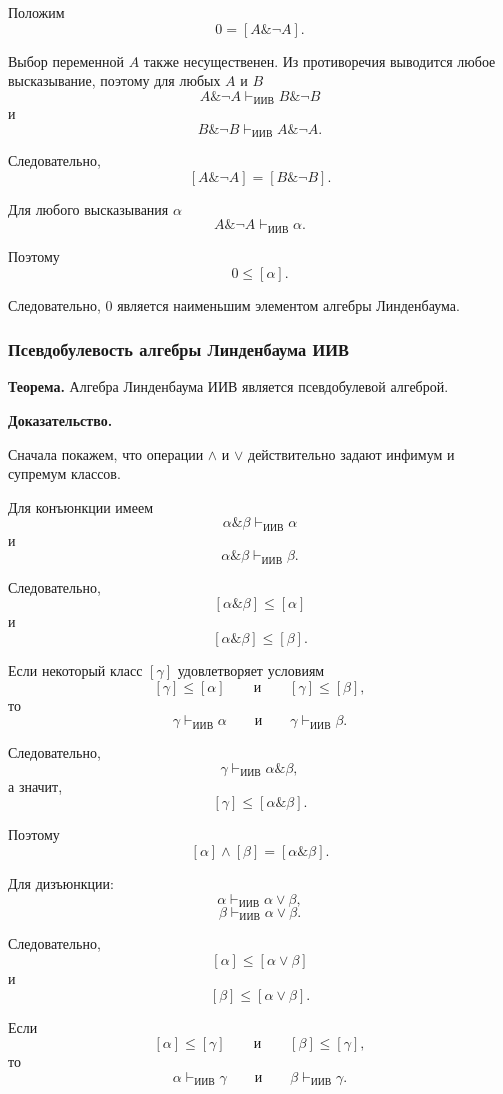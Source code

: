 \documentclass[12pt,a4paper,oneside,openany]{book}
\theoremstyle{definition}
\theoremstyle{plain}
\theoremstyle{remark}
\begin{document}
Положим
\[
0=[A\mathbin{\&}\neg A].
\]

Выбор переменной \(A\) также несущественен. Из противоречия выводится
любое высказывание, поэтому для любых \(A\) и \(B\)
\[
A\mathbin{\&}\neg A
\vdash_{\mathrm{ИИВ}}
B\mathbin{\&}\neg B
\]
и
\[
B\mathbin{\&}\neg B
\vdash_{\mathrm{ИИВ}}
A\mathbin{\&}\neg A.
\]

Следовательно,
\[
[A\mathbin{\&}\neg A]
=
[B\mathbin{\&}\neg B].
\]

Для любого высказывания \(\alpha\)
\[
A\mathbin{\&}\neg A
\vdash_{\mathrm{ИИВ}}
\alpha.
\]

Поэтому
\[
0\leq[\alpha].
\]

Следовательно, \(0\) является наименьшим элементом алгебры
Линденбаума.

\subsubsection{Псевдобулевость алгебры Линденбаума ИИВ}

\textbf{Теорема.}
Алгебра Линденбаума ИИВ является псевдобулевой алгеброй.

\textbf{Доказательство.}

Сначала покажем, что операции \(\wedge\) и \(\vee\) действительно
задают инфимум и супремум классов.

Для конъюнкции имеем
\[
\alpha\mathbin{\&}\beta
\vdash_{\mathrm{ИИВ}}
\alpha
\]
и
\[
\alpha\mathbin{\&}\beta
\vdash_{\mathrm{ИИВ}}
\beta.
\]

Следовательно,
\[
[\alpha\mathbin{\&}\beta]\leq[\alpha]
\]
и
\[
[\alpha\mathbin{\&}\beta]\leq[\beta].
\]

Если некоторый класс \([\gamma]\) удовлетворяет условиям
\[
[\gamma]\leq[\alpha]
\qquad\text{и}\qquad
[\gamma]\leq[\beta],
\]
то
\[
\gamma\vdash_{\mathrm{ИИВ}}\alpha
\qquad\text{и}\qquad
\gamma\vdash_{\mathrm{ИИВ}}\beta.
\]

Следовательно,
\[
\gamma\vdash_{\mathrm{ИИВ}}
\alpha\mathbin{\&}\beta,
\]
а значит,
\[
[\gamma]\leq[\alpha\mathbin{\&}\beta].
\]

Поэтому
\[
[\alpha]\wedge[\beta]
=
[\alpha\mathbin{\&}\beta].
\]

Для дизъюнкции:
\[
\alpha\vdash_{\mathrm{ИИВ}}\alpha\lor\beta,
\]
\[
\beta\vdash_{\mathrm{ИИВ}}\alpha\lor\beta.
\]

Следовательно,
\[
[\alpha]\leq[\alpha\lor\beta]
\]
и
\[
[\beta]\leq[\alpha\lor\beta].
\]

Если
\[
[\alpha]\leq[\gamma]
\qquad\text{и}\qquad
[\beta]\leq[\gamma],
\]
то
\[
\alpha\vdash_{\mathrm{ИИВ}}\gamma
\qquad\text{и}\qquad
\beta\vdash_{\mathrm{ИИВ}}\gamma.
\]
\end{document}
